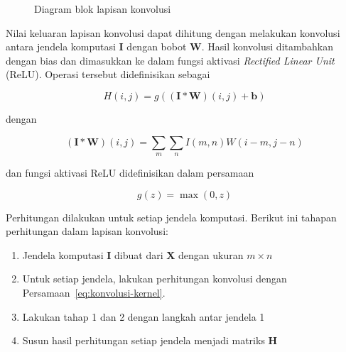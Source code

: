 \begin{figure}[h!]
    \centering
    \caption{Diagram blok lapisan konvolusi}
    \label{gambar:diagram-blok-kovolusi}
\end{figure}

Nilai keluaran lapisan konvolusi dapat dihitung dengan melakukan konvolusi antara jendela komputasi $\pmb{I}$ dengan bobot $\pmb{W}$. Hasil konvolusi ditambahkan dengan bias dan dimasukkan ke dalam fungsi aktivasi \textit{Rectified Linear Unit} (ReLU)\@. Operasi tersebut didefinisikan sebagai

\begin{equation}
    H(i,j) = g((\pmb{I} * \pmb{W})(i,j) + \pmb{b})
    \label{eq:konvolusi-kernel}
\end{equation}

\noindent
dengan

\begin{equation}
    (\pmb{I} * \pmb{W})(i,j) = \sum_{m}\sum_{n}I(m,n)W(i-m, j-n)
    \label{eq:konvolusi-3d}
\end{equation}

\noindent
dan fungsi aktivasi ReLU didefinisikan dalam persamaan

\begin{equation}
    g(z) = \max(0,z)
    \label{eq:relu}
\end{equation}

Perhitungan dilakukan untuk setiap jendela komputasi. Berikut ini tahapan perhitungan dalam lapisan konvolusi:

\begin{enumerate}
\item Jendela komputasi $\pmb{I}$ dibuat dari $\pmb{X}$ dengan ukuran $m \times n$
\item Untuk setiap jendela, lakukan perhitungan konvolusi dengan Persamaan~\ref{eq:konvolusi-kernel}.
\item Lakukan tahap 1 dan 2 dengan langkah antar jendela 1
\item Susun hasil perhitungan setiap jendela menjadi matriks $\pmb{H}$
\end{enumerate}

